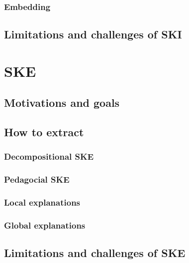 \documentclass[12pt,a4paper,openright,twoside]{book}
\begin{document}
\subsubsection{Embedding}\label{subsubsec:embedding}

\subsection{Limitations and challenges of \ac{SKI}}\label{subsec:limitations-and-challenges-of-ski}

\section{\Acl{SKE}}\label{sec:ske}

\subsection{Motivations and goals}\label{subsec:ske-motivations-and-goals}

\subsection{How to extract}\label{subsec:how-to-extract}

\subsubsection{Decompositional \ac{SKE}}\label{subsubsec:decompositional-ske}

\subsubsection{Pedagocial \ac{SKE}}\label{subsubsec:pedagogical-ske}

\subsubsection{Local explanations}\label{subsubsec:local-explanations}

\subsubsection{Global explanations}\label{subsubsec:global-explanations}

\subsection{Limitations and challenges of \ac{SKE}}\label{subsec:limitations-and-challenges-of-ske}
\end{document}
